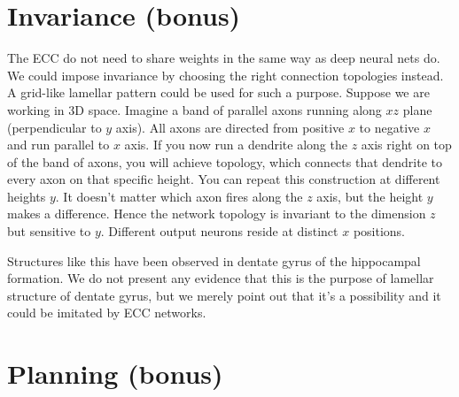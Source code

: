 \documentclass[12pt]{article}
\begin{document}
\section{Invariance (bonus)}

The ECC do not need to share weights in the same way as deep neural nets do.
We could impose invariance by choosing the right connection topologies instead.
A grid-like lamellar pattern could be used for such a purpose. Suppose we are working in 3D space. Imagine a band of parallel axons running along $xz$ plane (perpendicular to $y$ axis). All axons are directed from positive $x$ to negative $x$ and run parallel to $x$ axis. If you now run a dendrite along the $z$ axis right on top of the band of axons, you will achieve topology, which connects that dendrite to every axon on that specific height. You can repeat this construction at different heights $y$. It doesn't matter which axon fires along the $z$ axis, but the height $y$ makes a difference. Hence the network topology is invariant to the dimension $z$ but sensitive to $y$. Different output neurons reside at distinct $x$ positions.

Structures like this have been observed in dentate gyrus of the hippocampal formation. We do not present any evidence that this is the purpose of lamellar structure of dentate gyrus, but we merely point out that it's a possibility and it could be imitated by ECC networks.

\section{Planning (bonus)}
\end{document}
